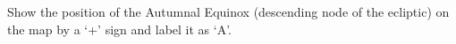 Show the position of the Autumnal Equinox (descending node of the ecliptic) on
the map by a `+' sign and label it as `A'.

